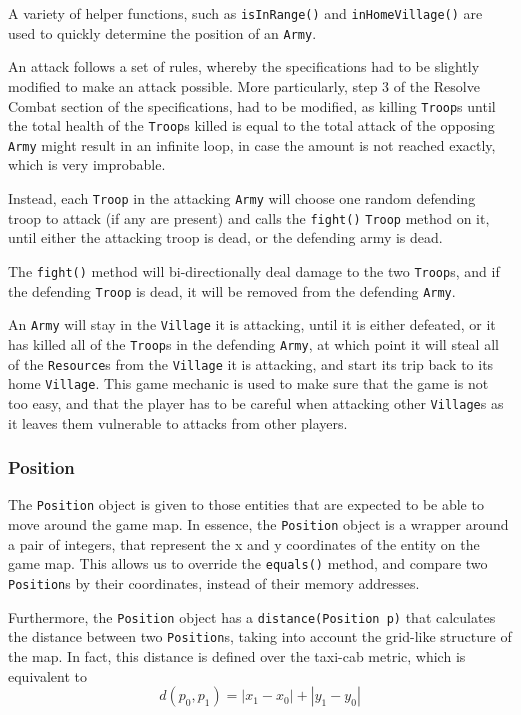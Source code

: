 \documentclass{article}
\newcommand{\code}[1]{\texttt{#1}}
\begin{document}
A variety of helper functions, such as \code{isInRange()} and \code{inHomeVillage()}
are used to quickly determine the position of an \code{Army}.

An attack follows a set of rules, whereby the specifications had to be slightly 
modified to make an attack possible. More particularly, step 3 of the Resolve Combat 
section of the specifications, had to be modified, as killing \code{Troop}s
until the total health of the \code{Troop}s killed is equal to the total attack
of the opposing \code{Army} might result in an infinite loop, in case the amount is not
reached exactly, which is very improbable.

Instead, each \code{Troop} in the attacking \code{Army} will choose one random
defending troop to attack (if any are present) and calls the \code{fight()} \code{Troop} method on it, 
until either the attacking troop is dead, or the defending army is dead.

The \code{fight()} method will bi-directionally deal damage to the two \code{Troop}s, 
and if the defending \code{Troop} is dead, it will be removed from the defending
\code{Army}.

An \code{Army} will stay in the \code{Village} it is attacking, until it is either 
defeated, or it has killed all of the \code{Troop}s in the defending
\code{Army}, at which point it will steal all of the \code{Resource}s from the
\code{Village} it is attacking, and start its trip back to its home \code{Village}. 
This game mechanic is used to make sure that the game is not too easy, and that
the player has to be careful when attacking other \code{Village}s as it leaves them
vulnerable to attacks from other players.
 

\subsubsection*{Position}
The \code{Position} object is given to those entities that are expected to be
able to move around the game map. In essence, the \code{Position} object is a wrapper around a pair of
integers, that represent the x and y coordinates of the entity on the game map. This allows 
us to override the \code{equals()} method, and compare two \code{Position}s
by their coordinates, instead of their memory addresses.

Furthermore, the \code{Position} object has a \code{distance(Position p)} that calculates 
the distance between two \code{Position}s, taking into account the grid-like structure of the map.
In fact, this distance is defined over the taxi-cab metric, which is equivalent to $$ d(p_0, p_1) = |x_1 - x_0| + |y_1 - y_0| $$
\end{document}
